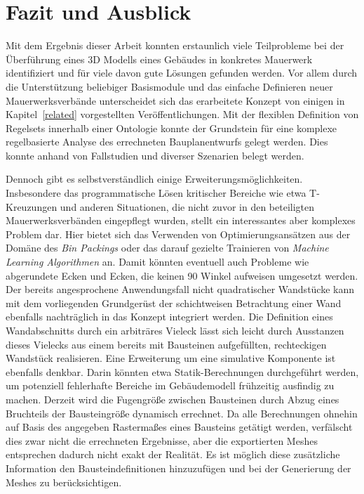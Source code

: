 \chapter{Fazit und Ausblick}
Mit dem Ergebnis dieser Arbeit konnten erstaunlich viele Teilprobleme bei der Überführung eines 3D Modells eines Gebäudes in konkretes Mauerwerk identifiziert und für viele davon gute Lösungen gefunden werden.
Vor allem durch die Unterstützung beliebiger Basismodule und das einfache Definieren neuer Mauerwerksverbände unterscheidet sich das erarbeitete Konzept von einigen in Kapitel~\ref{related} vorgestellten Veröffentlichungen.
Mit der flexiblen Definition von Regelsets innerhalb einer Ontologie konnte der Grundstein für eine komplexe regelbasierte Analyse des errechneten Bauplanentwurfs gelegt werden.
Dies konnte anhand von Fallstudien und diverser Szenarien belegt werden.

Dennoch gibt es selbstverständlich einige Erweiterungsmöglichkeiten.
Insbesondere das programmatische Lösen kritischer Bereiche wie etwa T-Kreuzungen und anderen Situationen, die nicht zuvor in den beteiligten Mauerwerksverbänden eingepflegt wurden, stellt ein interessantes aber komplexes Problem dar.
Hier bietet sich das Verwenden von Optimierungsansätzen aus der Domäne des \textit{Bin Packings} oder das darauf gezielte Trainieren von \textit{Machine Learning Algorithmen} an.
Damit könnten eventuell auch Probleme wie abgerundete Ecken und Ecken, die keinen 90\textdegree{} Winkel aufweisen umgesetzt werden.
Der bereits angesprochene Anwendungsfall nicht quadratischer Wandstücke kann mit dem vorliegenden Grundgerüst der schichtweisen Betrachtung einer Wand ebenfalls nachträglich in das Konzept integriert werden.
Die Definition eines Wandabschnitts durch ein arbiträres Vieleck lässt sich leicht durch \glqq{}Ausstanzen\grqq{} dieses Vielecks aus einem bereits mit Bausteinen aufgefüllten, rechteckigen Wandstück realisieren.
Eine Erweiterung um eine simulative Komponente ist ebenfalls denkbar.
Darin könnten etwa Statik-Berechnungen durchgeführt werden, um potenziell fehlerhafte Bereiche im Gebäudemodell frühzeitig ausfindig zu machen.
Derzeit wird die Fugengröße zwischen Bausteinen durch Abzug eines Bruchteils der Bausteingröße dynamisch errechnet.
Da alle Berechnungen ohnehin auf Basis des angegeben Rastermaßes eines Bausteins getätigt werden, verfälscht dies zwar nicht die errechneten Ergebnisse, aber die exportierten Meshes entsprechen dadurch nicht exakt der Realität.
Es ist möglich diese zusätzliche Information den Bausteindefinitionen hinzuzufügen und bei der Generierung der Meshes zu berücksichtigen.